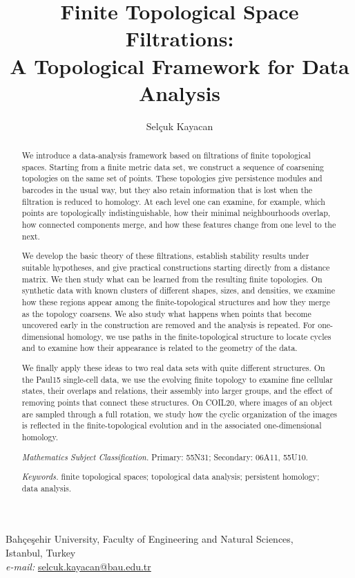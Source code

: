 \documentclass[a4paper,11pt]{article}
\title{Finite Topological Space Filtrations:\\
A Topological Framework for Data Analysis}
\author{Sel\c{c}uk Kayacan}
\date{}
\theoremstyle{definition}
\theoremstyle{remark}
\begin{document}
\maketitle

\begin{center}
Bah\c{c}e\c{s}ehir University, Faculty of Engineering and Natural Sciences,\\
Istanbul, Turkey\\
\emph{e-mail:} \href{mailto:selcuk.kayacan@bau.edu.tr}{selcuk.kayacan@bau.edu.tr}
\end{center}

\begin{abstract}
We introduce a data-analysis framework based on filtrations of finite topological spaces. Starting from a finite metric data set, we construct a sequence of coarsening topologies on the same set of points. These topologies give persistence modules and barcodes in the usual way, but they also retain information that is lost when the filtration is reduced to homology. At each level one can examine, for example, which points are topologically indistinguishable, how their minimal neighbourhoods overlap, how connected components merge, and how these features change from one level to the next.

We develop the basic theory of these filtrations, establish stability results under suitable hypotheses, and give practical constructions starting directly from a distance matrix. We then study what can be learned from the resulting finite topologies. On synthetic data with known clusters of different shapes, sizes, and densities, we examine how these regions appear among the finite-topological structures and how they merge as the topology coarsens. We also study what happens when points that become uncovered early in the construction are removed and the analysis is repeated. For one-dimensional homology, we use paths in the finite-topological structure to locate cycles and to examine how their appearance is related to the geometry of the data.

We finally apply these ideas to two real data sets with quite different structures. On the Paul15 single-cell data, we use the evolving finite topology to examine fine cellular states, their overlaps and relations, their assembly into larger groups, and the effect of removing points that connect these structures. On COIL20, where images of an object are sampled through a full rotation, we study how the cyclic organization of the images is reflected in the finite-topological evolution and in the associated one-dimensional homology.

\smallskip
{} \emph{Mathematics Subject Classification.}
Primary: 55N31; Secondary: 06A11, 55U10.

\smallskip
\noindent \emph{Keywords.}
finite topological spaces; topological data analysis; persistent homology; data analysis.
\end{abstract}
\end{document}
